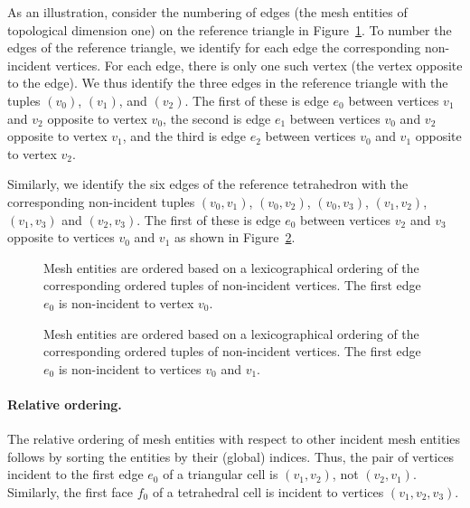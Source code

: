 As an illustration, consider the numbering of edges (the mesh entities
of topological dimension one) on the reference triangle in
Figure~\ref{fig:orderingexample,triangle}. To number the edges of the
reference triangle, we identify for each edge the corresponding
non-incident vertices. For each edge, there is only one such vertex
(the vertex opposite to the edge). We thus identify the three edges in
the reference triangle with the tuples $(v_0)$, $(v_1)$, and $(v_2)$. The
first of these is edge $e_0$ between vertices $v_1$ and $v_2$ opposite
to vertex $v_0$, the second is edge $e_1$ between vertices $v_0$ and
$v_2$ opposite to vertex $v_1$, and the third is edge $e_2$ between
vertices $v_0$ and $v_1$ opposite to vertex $v_2$.

Similarly, we identify the six edges of the reference tetrahedron with
the corresponding non-incident tuples $(v_0, v_1)$, $(v_0, v_2)$,
$(v_0, v_3)$, $(v_1, v_2)$, $(v_1, v_3)$ and $(v_2, v_3)$. The first
of these is edge $e_0$ between vertices $v_2$ and $v_3$ opposite to
vertices $v_0$ and $v_1$ as shown in
Figure~\ref{fig:orderingexample,tetrahedron}.

\begin{figure}
  \begin{center}
    \caption{Mesh entities are ordered based on a lexicographical
      ordering of the corresponding ordered tuples of non-incident
      vertices. The first edge $e_0$ is non-incident to vertex $v_0$.}
    \label{fig:orderingexample,triangle}
  \end{center}
\end{figure}

\begin{figure}
  \begin{center}
    \caption{Mesh entities are ordered based on a lexicographical
      ordering of the corresponding ordered tuples of non-incident
      vertices. The first edge $e_0$ is non-incident to vertices $v_0$
      and $v_1$.}
    \label{fig:orderingexample,tetrahedron}
  \end{center}
\end{figure}

\paragraph{Relative ordering.}

The relative ordering of mesh entities with respect to other incident
mesh entities follows by sorting the entities by their (global)
indices. Thus, the pair of vertices incident to the first edge $e_0$
of a triangular cell is $(v_1, v_2)$, not $(v_2, v_1)$. Similarly, the
first face $f_0$ of a tetrahedral cell is incident to vertices $(v_1,
v_2, v_3)$.


